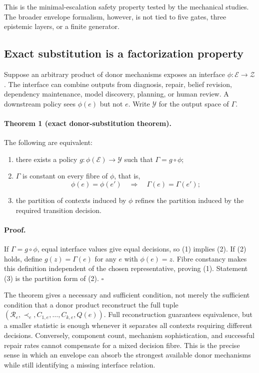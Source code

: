 This is the minimal-escalation safety property tested by the mechanical
studies. The broader envelope formalism, however, is not tied to five gates,
three epistemic layers, or a finite generator.

\subsection{Exact substitution is a factorization property}

Suppose an arbitrary product of donor mechanisms exposes an interface
$\phi:\mathcal E\to\mathcal Z$. The interface can combine outputs from
diagnosis, repair, belief revision, dependency maintenance, model discovery,
planning, or human review. A downstream policy sees $\phi(e)$ but not $e$.
Write $\mathcal Y$ for the output space of $\Gamma$.

\paragraph{Theorem 1 (exact donor-substitution theorem).}
The following are equivalent:
\begin{enumerate}
  \item there exists a policy $g:\phi(\mathcal E)\to\mathcal Y$ such that
  $\Gamma=g\circ\phi$;
  \item $\Gamma$ is constant on every fibre of $\phi$, that is,
  \[
  \phi(e)=\phi(e')\quad\Longrightarrow\quad\Gamma(e)=\Gamma(e');
  \]
  \item the partition of contexts induced by $\phi$ refines the partition
  induced by the required transition decision.
\end{enumerate}

\paragraph{Proof.}
If $\Gamma=g\circ\phi$, equal interface values give equal decisions, so (1)
implies (2). If (2) holds, define $g(z)=\Gamma(e)$ for any $e$ with
$\phi(e)=z$. Fibre constancy makes this definition independent of the chosen
representative, proving (1). Statement (3) is the partition form of (2).
\hfill$\square$

The theorem gives a necessary and sufficient condition, not merely the
sufficient condition that a donor product reconstruct the full tuple
$(\mathcal R_e,\prec_e,C_{1,e},\ldots,C_{k,e},Q(e))$. Full reconstruction
guarantees equivalence, but a smaller statistic is enough whenever it separates
all contexts requiring different decisions. Conversely, component count,
mechanism sophistication, and successful repair rates cannot compensate for a
mixed decision fibre. This is the precise sense in which an envelope can
absorb the strongest available donor mechanisms while still identifying a missing
interface relation.


